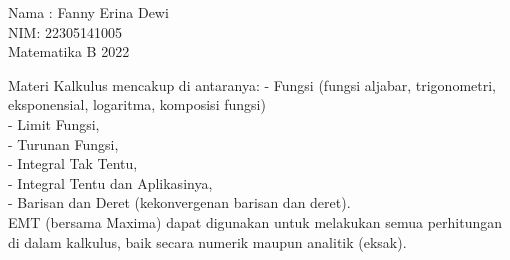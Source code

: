 \documentclass{article}
\begin{document}
\begin{eulernotebook}
\eulersubheading{}
\begin{eulercomment}
Nama : Fanny Erina Dewi\\
NIM: 22305141005\\
Matematika B 2022\\
\end{eulercomment}
\eulersubheading{}
\begin{eulercomment}
\begin{eulercomment}
\begin{eulercomment}
Materi Kalkulus mencakup di antaranya: - Fungsi (fungsi aljabar,
trigonometri, eksponensial, logaritma, komposisi fungsi)\\
- Limit Fungsi,\\
- Turunan Fungsi,\\
- Integral Tak Tentu,\\
- Integral Tentu dan Aplikasinya,\\
- Barisan dan Deret (kekonvergenan barisan dan deret).\\
EMT (bersama Maxima) dapat digunakan untuk melakukan semua perhitungan
di dalam kalkulus, baik secara numerik maupun analitik (eksak).


\end{eulercomment}
\end{eulercomment}
\end{eulercomment}
\end{eulernotebook}
\end{document}
